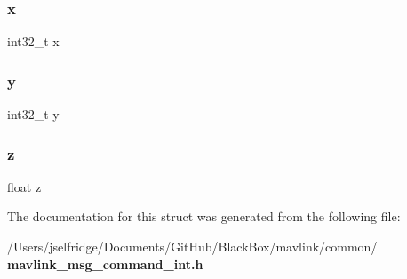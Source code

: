 \mbox{\label{struct____mavlink__command__int__t_af6d3062751bd565decb1a2cd3b63bdb2}} 
\subsubsection{x}
{\footnotesize\ttfamily int32\+\_\+t x}

\mbox{\label{struct____mavlink__command__int__t_af64066d134a77e01b3d6eb8da813627a}} 
\subsubsection{y}
{\footnotesize\ttfamily int32\+\_\+t y}

\mbox{\label{struct____mavlink__command__int__t_af73583b1e980b0aa03f9884812e9fd4d}} 
\subsubsection{z}
{\footnotesize\ttfamily float z}



The documentation for this struct was generated from the following file\+:\begin{DoxyCompactItemize}
\item 
/\+Users/jselfridge/\+Documents/\+Git\+Hub/\+Black\+Box/mavlink/common/\textbf{ mavlink\+\_\+msg\+\_\+command\+\_\+int.\+h}\end{DoxyCompactItemize}
